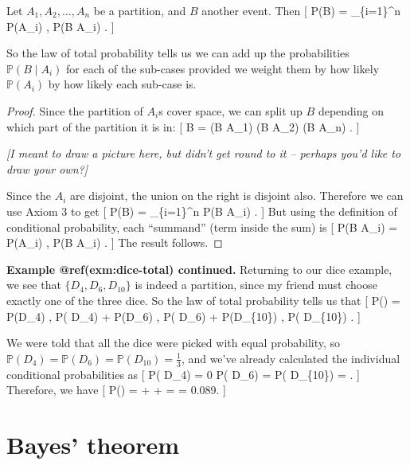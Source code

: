 \documentclass[
  letterpaper,
]{report}
\theoremstyle{definition}
\theoremstyle{definition}
\theoremstyle{remark}
\begin{document}
\leavevmode{}%
Let \(A_1, A_2, \dots, A_n\) be a partition, and \(B\) another event.
Then {[} \mathbb P(B) = \sum\_\{i=1\}\^{}n \mathbb P(A\_i) , \mathbb P(B
\mid A\_i) . {]}

So the law of total probability tells us we can add up the probabilities
\(\mathbb P(B \mid A_i)\) for each of the sub-cases provided we weight
them by how likely \(\mathbb P(A_i)\) by how likely each sub-case is.

\begin{proof}

Since the partition of \(A_i\)s cover space, we can split up \(B\)
depending on which part of the partition it is in: {[} B = (B \cap A\_1)
\cup (B \cap A\_2) \cup \cdots \cup (B \cap A\_n) . {]}

\emph{{[}I meant to draw a picture here, but didn't get round to it --
perhaps you'd like to draw your own?{]}}

Since the \(A_i\) are disjoint, the union on the right is disjoint also.
Therefore we can use Axiom 3 to get {[} \mathbb P(B) =
\sum\_\{i=1\}\^{}n \mathbb P(B \cap A\_i) . {]} But using the definition
of conditional probability, each ``summand'' (term inside the sum) is
{[} \mathbb P(B \cap A\_i) = \mathbb P(A\_i) , \mathbb P(B \mid A\_i) .
{]} The result follows.

\end{proof}

\textbf{Example @ref(exm:dice-total) continued.} Returning to our dice
example, we see that \(\{D_4, D_6, D_{10}\}\) is indeed a partition,
since my friend must choose exactly one of the three dice. So the law of
total probability tells us that {[} \mathbb P() =
\mathbb P(D\_4) , \mathbb P( \mid D\_4) + \mathbb P(D\_6) ,
\mathbb P( \mid D\_6) + \mathbb P(D\_\{10\}) ,
\mathbb P( \mid D\_\{10\}) . {]}

We were told that all the dice were picked with equal probability, so
\(\mathbb P(D_4) = \mathbb P(D_6) = \mathbb P(D_{10}) = \frac13\), and
we've already calculated the individual conditional probabilities as {[}
\mathbb P( \mid D\_4) = 0 \qquad \mathbb P(
\mid D\_6) =  \qquad \mathbb P( \mid D\_\{10\}) =
 . {]} Therefore, we have {[} \mathbb P() =
 + \times{} + \times{} =
 = 0.089. {]}

\hypertarget{bayes}{%
\section{Bayes' theorem}\label{bayes}}
\end{document}
